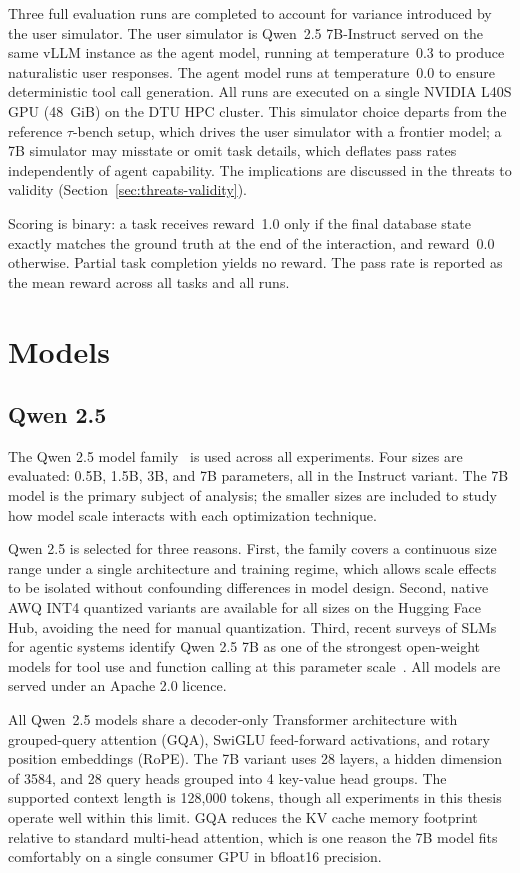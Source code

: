 Three full evaluation runs are completed to account for variance
introduced by the user simulator. The user simulator is Qwen~2.5
7B-Instruct served on the same vLLM instance as the agent model,
running at temperature~0.3 to produce naturalistic user responses.
The agent model runs at temperature~0.0 to ensure deterministic
tool call generation. All runs are executed on a single NVIDIA L40S
GPU (48~GiB) on the DTU HPC cluster. This simulator choice departs
from the reference $\tau$-bench setup, which drives the user
simulator with a frontier model; a 7B simulator may misstate or omit
task details, which deflates pass rates independently of agent
capability. The implications are discussed in the threats to
validity (Section~\ref{sec:threats-validity}).

Scoring is binary: a task receives reward~1.0 only if the final
database state exactly matches the ground truth at the end of the
interaction, and reward~0.0 otherwise. Partial task completion
yields no reward. The pass rate is reported as the mean reward
across all tasks and all runs.

\section{Models}
\subsection{Qwen 2.5}

The Qwen 2.5 model family~\cite{qwen2024qwen25} is used
across all experiments. Four sizes are evaluated: 0.5B,
1.5B, 3B, and 7B parameters, all in the Instruct variant.
The 7B model is the primary subject of analysis; the
smaller sizes are included to study how model scale
interacts with each optimization technique.

Qwen 2.5 is selected for three reasons. First, the family
covers a continuous size range under a single architecture
and training regime, which allows scale effects to be
isolated without confounding differences in model design.
Second, native AWQ INT4 quantized variants are available
for all sizes on the Hugging Face Hub, avoiding the need
for manual quantization. Third, recent surveys of SLMs for
agentic systems identify Qwen 2.5 7B as one of the
strongest open-weight models for tool use and function
calling at this parameter scale~\cite{sharma2025slmagents}.
All models are served under an Apache 2.0 licence.

All Qwen~2.5 models share a decoder-only Transformer
architecture with grouped-query attention (GQA), SwiGLU
feed-forward activations, and rotary position embeddings
(RoPE). The 7B variant uses 28 layers, a hidden dimension
of 3584, and 28 query heads grouped into 4 key-value head
groups. The supported context length is 128{,}000 tokens,
though all experiments in this thesis operate well within
this limit. GQA reduces the KV cache memory footprint
relative to standard multi-head attention, which is one
reason the 7B model fits comfortably on a single consumer
GPU in bfloat16 precision.

